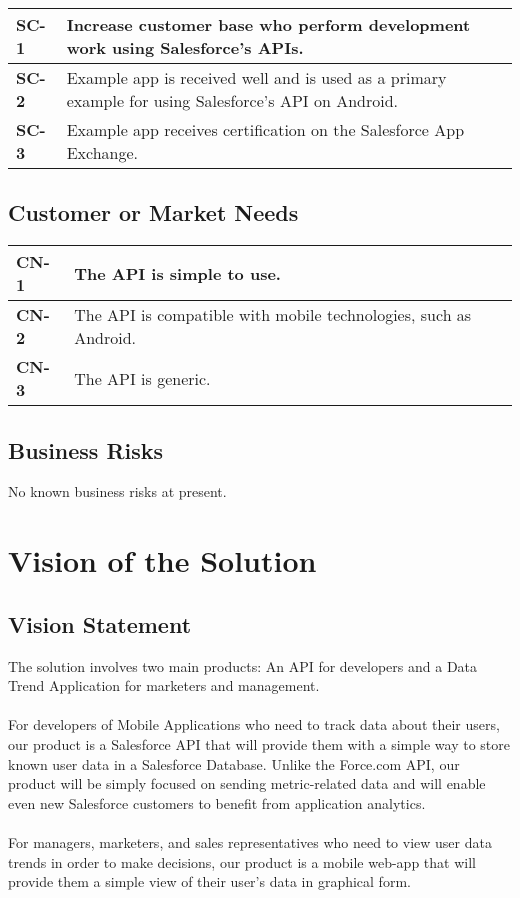 \documentclass[12pt,oneside,letterpaper]{article}
\begin{document}
\vfill
\noindent
\begin{tabular} {| p{1in} | p{4.5in} |}
\hline
\textbf{SC-1} & Increase customer base who perform development work using Salesforce's APIs.\\

\hline
\textbf{SC-2} & Example app is received well and is used as a primary example for using Salesforce's API on Android.\\ %

\hline
\textbf{SC-3} & Example app receives certification on the Salesforce App Exchange.\\
\hline
\end{tabular}

\subsection{Customer or Market Needs}

\begin{tabular} {| p{1in} | p{4.5in} |}
\hline
\textbf{CN-1} & The API is simple to use.\\

\hline
\textbf{CN-2} & The API is compatible with mobile technologies, such as Android.\\

\hline
\textbf{CN-3} & The API is generic.\\
\hline
\end{tabular}

\subsection{Business Risks}
No known business risks at present.

\section{Vision of the Solution}
\subsection{Vision Statement}
The solution involves two main products: An API for developers and a Data Trend Application for marketers and management.\\\\
For developers of Mobile Applications who need to track data about their users, our product is a Salesforce API that will provide them with a simple way to store known user data in a Salesforce Database. Unlike the Force.com API, our product will be simply focused on sending metric-related data and will enable even new Salesforce customers to benefit from application analytics.\\\\
For managers, marketers, and sales representatives who need to view user data trends in order to make decisions, our product is a mobile web-app that will provide them a simple view of their user’s data in graphical form. 
\end{document}
